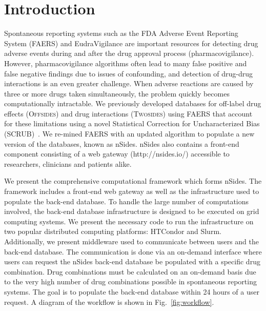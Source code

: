 \documentclass{ws-procs11x85}
\begin{document}
\bodymatter

\section{Introduction}

Spontaneous reporting systems such as the FDA Adverse Event Reporting
System (FAERS) and EudraVigilance are important resources for
detecting drug adverse events during and after the drug approval
process (pharmacovigilance). However, pharmacovigilance algorithms
often lead to many false positive and false negative findings due to
issues of confounding, and detection of drug-drug interactions is an
even greater challenge. When adverse reactions are caused by three or
more drugs taken simultaneously, the problem quickly becomes
computationally intractable. We previously developed databases for
off-label drug effects (O\textsc{ffsides}) and drug interactions
(T\textsc{wosides}) using FAERS that account for these limitations
using a novel Statistical Correction for Uncharacterized Bias
(SCRUB)~\cite{Tatonetti2012}.  We re-mined FAERS with an updated
algorithm to populate a new version of the databases, known as nSides.
nSides also contains a front-end component consisting of a web gateway
(http://nsides.io/) accessible to researchers, clinicians and patients
alike.

We present the comprehensive computational framework which forms
nSides. The framework includes a front-end web gateway as well as the
infrastructure used to populate the back-end database.  To handle the
large number of computations involved, the back-end database
infrastructure is designed to be executed on grid computing
systems. We present the necessary code to run the infrastructure on
two popular distributed computing platforms: HTCondor and
Slurm. Additionally, we present middleware used to communicate between
users and the back-end database.  The communication is done via an
on-demand interface where users can request the nSides back-end
database be populated with a specific drug combination. Drug
combinations must be calculated on an on-demand basis due to the very
high number of drug combinations possible in spontaneous reporting
systems. The goal is to populate the back-end database within 24 hours
of a user request. A diagram of the workflow is shown in
Fig.~\ref{fig:workflow}.
\end{document}
